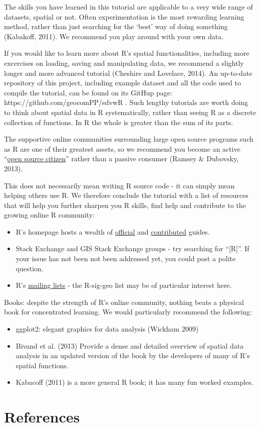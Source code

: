 \documentclass[]{article}
\begin{document}
The skills you have learned in this tutorial are applicable to a very
wide range of datasets, spatial or not. Often experimentation is the
most rewarding learning method, rather than just searching for the
`best' way of doing something (Kabakoff, 2011). We recommend you play
around with your own data.

If you would like to learn more about R's spatial functionalities,
including more excercises on loading, saving and manipulating data, we
recommend a slightly longer and more advanced tutorial (Cheshire and
Lovelace, 2014). An up-to-date repository of this project, including
example dataset and all the code used to compile the tutorial, can be
found on its GitHup page: https://github.com/geocomPP/sdvwR . Such
lengthy tutorials are worth doing to think about spatial data in R
systematically, rather than seeing R as a discrete collection of
functions. In R the whole is greater than the sum of its parts.

The supportive online communities surrounding large open source programs
such as R are one of their greatest assets, so we recommend you become
an active
``\href{http://blog.cleverelephant.ca/2013/10/being-open-source-citizen.html}{open
source citizen}'' rather than a passive consumer (Ramsey \& Dubovsky,
2013).

This does not necessarily mean writing R source code - it can simply
mean helping others use R. We therefore conclude the tutorial with a
list of resources that will help you further sharpen you R skills, find
help and contribute to the growing online R community:

\begin{itemize}
\item
  R's homepage hosts a wealth of
  \href{http://cran.r-project.org/manuals.html}{official} and
  \href{http://cran.r-project.org/other-docs.html}{contributed} guides.
\item
  Stack Exchange and GIS Stack Exchange groups - try searching for
  ``{[}R{]}''. If your issue has not been not been addressed yet, you
  could post a polite question.
\item
  R's \href{http://www.r-project.org/mail.html}{mailing lists} - the
  R-sig-geo list may be of particular interest here.
\end{itemize}
Books: despite the strength of R's online community, nothing beats a
physical book for concentrated learning. We would particularly recommend
the following:

\begin{itemize}
\item
  ggplot2: elegant graphics for data analysis (Wickham 2009)
\item
  Bivand et al. (2013) Provide a dense and detailed overview of spatial
  data analysis in an updated version of the book by the developers of
  many of R's spatial functions.
\item
  Kabacoff (2011) is a more general R book; it has many fun worked
  examples.
\end{itemize}
\newpage \section{References}
\end{document}
